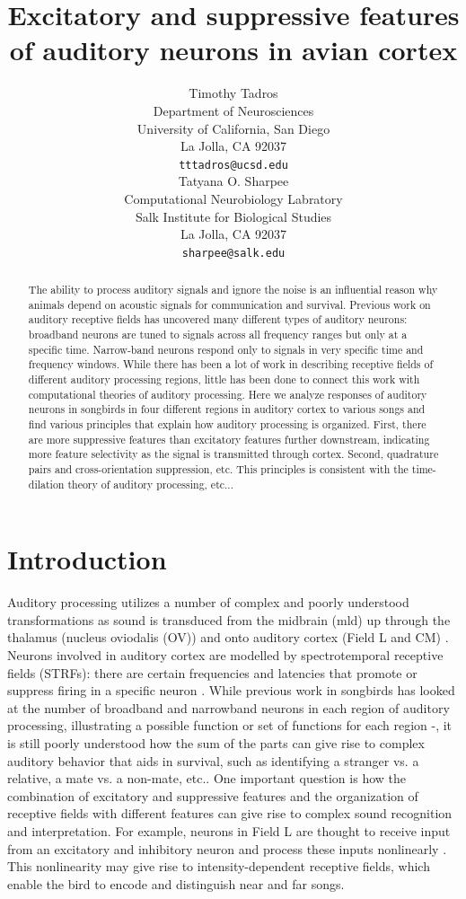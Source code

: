 \documentclass{article}
\title{Excitatory and suppressive features of auditory neurons in avian cortex}
\author{
  Timothy Tadros\\
  Department of Neurosciences\\
  University of California, San Diego\\
  La Jolla, CA 92037 \\
  \texttt{tttadros@ucsd.edu} \\
  \And
  Tatyana O. Sharpee\\
  Computational Neurobiology Labratory\\
  Salk Institute for Biological Studies\\
  La Jolla, CA 92037\\
  \texttt{sharpee@salk.edu}\\
}
\begin{document}

\maketitle

\begin{abstract}
  The ability to process auditory signals and ignore the noise is an influential reason why animals depend on acoustic signals for communication and survival. Previous work on auditory receptive fields has uncovered many different types of auditory neurons: broadband neurons are tuned to signals across all frequency ranges but only at a specific time. Narrow-band neurons respond only to signals in very specific time and frequency windows. While there has been a lot of work in describing receptive fields of different auditory processing regions, little has been done to connect this work with computational theories of auditory processing. Here we analyze responses of auditory neurons in songbirds in four different regions in auditory cortex to various songs and find various principles that explain how auditory processing is organized. First, there are more suppressive features than excitatory features further downstream, indicating more feature selectivity as the signal is transmitted through cortex. Second, quadrature pairs and cross-orientation suppression, etc. This principles is consistent with the time-dilation theory of auditory processing, etc...
\end{abstract}

\section{Introduction}

Auditory processing utilizes a number of complex and poorly understood transformations as sound is transduced from the midbrain (mld) up through the thalamus (nucleus oviodalis (OV)) and onto auditory cortex (Field L and CM) \cite{ondracek2013advances}. Neurons involved in auditory cortex are modelled by spectrotemporal receptive fields (STRFs): there are certain frequencies and latencies that promote or suppress firing in a specific neuron \cite{aertsen1981spectro}. While previous work in songbirds has looked at the number of broadband and narrowband neurons in each region of auditory processing, illustrating a possible function or set of functions for each region \cite{woolley2009functional}-\cite{amin2010role}, it is still poorly understood how the sum of the parts can give rise to complex auditory behavior that aids in survival, such as identifying a stranger vs. a relative, a mate vs. a non-mate, etc.. One important question is how the combination of excitatory and suppressive features and the organization of receptive fields with different features can give rise to complex sound recognition and interpretation. For example, neurons in Field L are thought to receive input from an excitatory and inhibitory neuron and process these inputs nonlinearly \cite{nagel2008organizing}. This nonlinearity may give rise to intensity-dependent receptive fields, which enable the bird to encode and distinguish near and far songs.
\end{document}
